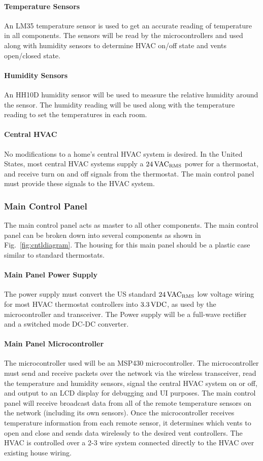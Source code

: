\paragraph{Temperature Sensors}
An LM35 temperature sensor is used to get an accurate reading of temperature in all components. The sensors will be read by the microcontrollers and used along with humidity sensors to determine HVAC on/off state and vents open/closed state.
\paragraph{Humidity Sensors}
An HH10D humidity sensor will be used to measure the relative humidity around the sensor.  The humidity reading will be used along with the temperature reading to set the temperatures in each room.
\paragraph{Central HVAC}
No modifications to a home's central HVAC system is desired.  In the United States, most central HVAC systems supply a $24\, \rm VAC_{RMS}$ power for a thermostat, and receive turn on and off signals from the thermostat.  The main control panel must provide these signals to the HVAC system.
\subsubsection{Main Control Panel}
The main control panel acts as master to all other components.  The main control panel can be broken down into several components as shown in Fig.~\ref{fig:cntldiagram}. The housing for this main panel should be a plastic case similar to standard thermostats.
\paragraph{Main Panel Power Supply}
The power supply must convert the US standard $24\,\rm VAC_{RMS}$ low voltage wiring for most HVAC thermostat controllers into $3.3\,\rm VDC$, as used by the microcontroller and transceiver. The Power supply will be a full-wave rectifier and a switched mode DC-DC converter.
\paragraph{Main Panel Microcontroller}
The microcontroller used will be an MSP430 microcontroller. The microcontroller must send and receive packets over the network via the wireless transceiver, read the temperature and humidity sensors, signal the central HVAC system on or off, and output to an LCD display for debugging and UI purposes. The main control panel will receive broadcast data from all of the remote temperature sensors on the network (including its own sensors). Once the microcontroller receives temperature information from each remote sensor, it determines which vents to open and close and sends data wirelessly to the desired vent controllers. The HVAC is controlled over a 2-3 wire system connected directly to the HVAC over existing house wiring.
